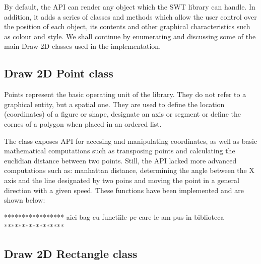 By default, the API can render any object which the SWT library can handle. In addition, it adds a series of 
classes and methods which allow the user control over the position of each object, its contents and other 
graphical characteristics such as colour and style. We shall continue by enumerating and discussing some of 
the main Draw-2D classes used in the implementation.

\subsection{Draw 2D Point class}

Points represent the basic operating unit of the library. They do not refer to a graphical entity, but a 
spatial one. They are used to define the location (coordinates) of a figure or shape, designate an axis 
or segment or define the cornes of a polygon when placed in an ordered list.

The class exposes API for accesing and manipulating coordinates, as well as basic mathematical computations 
such as transposing points and calculating the euclidian distance between two points. Still, the API lacked more 
advanced computations such as: manhattan distance, determining the angle between the X axis and the line 
designated by two poins and moving the point in a general direction with a given speed. These functions 
have been implemented and are shown below:

***************** aici bag cu functiile pe care le-am pus in biblioteca *****************

\subsection{Draw 2D Rectangle class}


